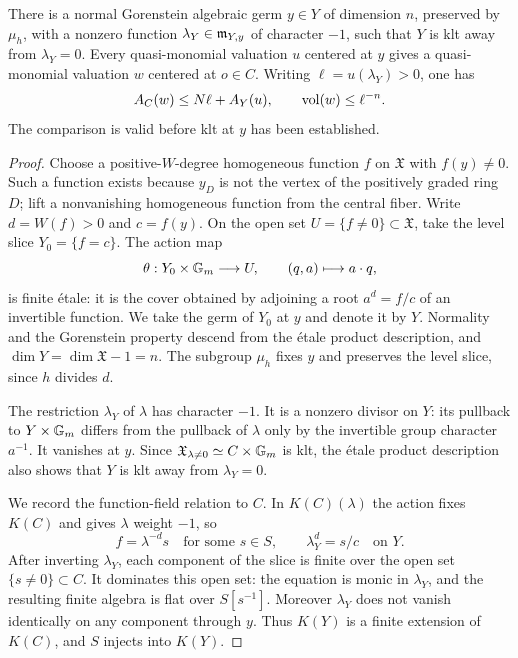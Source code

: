 \begin{lemma}
\label{boot:slice-tests}
There is a normal Gorenstein algebraic germ $y\in Y$ of dimension
$n$, preserved by $\mu_h$, with a nonzero function
$\lambda_Y\in\mathfrak m_{Y,y}$ of character $-1$, such that $Y$ is klt
away from $\lambda_Y=0$.  Every quasi-monomial valuation $u$ centered
at $y$ gives a quasi-monomial valuation $w$ centered at $o\in C$.
Writing $\ell=u(\lambda_Y)>0$, one has
\begin{equation}
 \label{boot:basic-test}
 A_C(w)\leq N\ell+A_Y(u),
 \qquad
 \operatorname{vol}(w)\leq \ell^{-n}.
\end{equation}
The comparison is valid before klt at $y$ has been established.
\end{lemma}

\begin{proof}
Choose a positive-$W$-degree homogeneous function $f$ on
$\mathfrak X$ with $f(y)\neq0$.  Such a function exists because
$y_D$ is not the vertex of the positively graded ring $D$; lift a
nonvanishing homogeneous function from the central fiber.  Write
$d=W(f)>0$ and $c=f(y)$.  On the open set
$U=\{f\neq0\}\subset\mathfrak X$, take the level slice
$Y_0=\{f=c\}$.  The action map
\[
 \theta:Y_0\times\mathbb G_m\longrightarrow U,
 \qquad (q,a)\longmapsto a\cdot q,
\]
is finite étale: it is the cover obtained by adjoining a root
$a^d=f/c$ of an invertible function.  We take the germ of $Y_0$
at $y$ and denote it by $Y$.  Normality and the Gorenstein property
descend from the étale product description, and
$\dim Y=\dim\mathfrak X-1=n$.  The subgroup $\mu_h$ fixes $y$
and preserves the level slice, since $h$ divides $d$.

The restriction $\lambda_Y$ of $\lambda$ has character $-1$.
It is a nonzero divisor on $Y$: its pullback to
$Y\times\mathbb G_m$ differs from the pullback of $\lambda$ only by
the invertible group character $a^{-1}$.  It vanishes at $y$.
Since $\mathfrak X_{\lambda\neq0}\simeq C\times\mathbb G_m$ is klt,
the étale product description also shows that $Y$ is klt away
from $\lambda_Y=0$.

We record the function-field relation to $C$.  In
$K(C)(\lambda)$ the action fixes $K(C)$ and gives $\lambda$
weight $-1$, so
\[
 f=\lambda^{-d}s\quad\text{for some }s\in S,
 \qquad
 \lambda_Y^d=s/c\quad\text{on }Y.
\]
After inverting $\lambda_Y$, each component of the slice is finite
over the open set $\{s\neq0\}\subset C$.  It dominates this open
set: the equation is monic in $\lambda_Y$, and the resulting finite
algebra is flat over $S[s^{-1}]$.  Moreover $\lambda_Y$ does not
vanish identically on any component through $y$.  Thus $K(Y)$ is a
finite extension of $K(C)$, and $S$ injects into $K(Y)$.


\end{proof}
